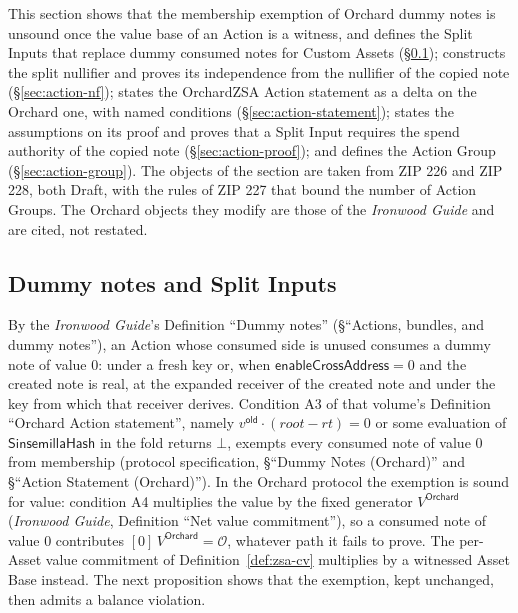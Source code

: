 \documentclass[11pt,a4paper]{article}
\theoremstyle{definition}
\begin{document}
This section shows that the membership exemption of Orchard dummy notes is
unsound once the value base of an Action is a witness, and defines the
Split Inputs that replace dummy consumed notes for Custom Assets
(\S\ref{sec:action-split}); constructs the split nullifier and proves its
independence from the nullifier of the copied note (\S\ref{sec:action-nf});
states the OrchardZSA Action statement as a delta on the Orchard one, with
named conditions (\S\ref{sec:action-statement}); states the assumptions on
its proof and proves that a Split Input requires the spend authority of the
copied note (\S\ref{sec:action-proof}); and defines the Action Group
(\S\ref{sec:action-group}). The objects of the section are taken from ZIP
226 and ZIP 228, both Draft, with the rules of ZIP 227 that bound the number
of Action Groups. The Orchard objects they modify are those of the
\emph{Ironwood Guide} and are cited, not restated.

\subsection{Dummy notes and Split Inputs}\label{sec:action-split}

By the \emph{Ironwood Guide}'s Definition ``Dummy notes'' (\S``Actions,
bundles, and dummy notes''), an Action whose consumed side is unused
consumes a dummy note of value $0$: under a fresh key or, when
$\mathsf{enableCrossAddress} = 0$ and the created note is real, at the
expanded receiver of the created note and under the key from which that
receiver derives. Condition A3 of that
volume's Definition ``Orchard Action statement'', namely
$v^{\mathsf{old}} \cdot (\mathit{root} - \mathit{rt}) = 0$ or some
evaluation of $\mathsf{SinsemillaHash}$ in the fold returns $\bot$, exempts
every consumed note of value $0$ from membership (protocol specification,
\S``Dummy Notes (Orchard)'' and \S``Action Statement (Orchard)''). In the
Orchard protocol the exemption is sound for value: condition A4 multiplies
the value by the fixed generator $V^{\mathsf{Orchard}}$ (\emph{Ironwood
Guide}, Definition ``Net value commitment''), so a consumed note of value
$0$ contributes $[0]\,V^{\mathsf{Orchard}} = \mathcal{O}$, whatever path it
fails to prove. The per-Asset value commitment of
Definition~\ref{def:zsa-cv} multiplies by a witnessed Asset Base instead.
The next proposition shows that the exemption, kept unchanged, then admits
a balance violation.
\end{document}
